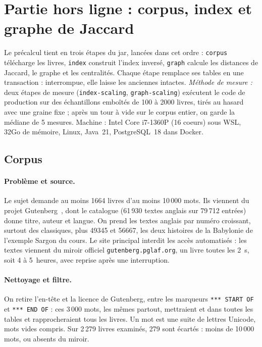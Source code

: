 \section{Partie hors ligne : corpus, index et graphe de Jaccard}
\label{sec:horsligne}

Le précalcul tient en trois étapes du jar, lancées dans cet ordre :
\texttt{corpus} télécharge les livres, \texttt{index} construit l'index inversé,
\texttt{graph} calcule les distances de Jaccard, le graphe et les centralités.
Chaque étape remplace ses tables en une transaction : interrompue, elle laisse
les anciennes intactes. \emph{Méthode de mesure :} deux étapes de mesure
(\texttt{index-scaling}, \texttt{graph-scaling}) exécutent le code de
production sur des échantillons emboîtés de 100 à 2000 livres, tirés au hasard
avec une graine fixe ; après un tour à vide sur le corpus entier, on garde la
médiane de 5 mesures. Machine : Intel Core i7-1360P (16 coeurs) sous WSL, 32Go de
mémoire, Linux, Java~21, PostgreSQL~18 dans Docker.

\subsection{Corpus}
\label{sec:corpus}

\paragraph{Problème et source.} Le sujet demande au moins 1664 livres d'au
moins 10\,000 mots. Ils viennent du projet Gutenberg~\cite{gutenberg}, dont le
catalogue (61\,930 textes anglais sur 79\,712 entrées) donne titre, auteur et
langue. On prend les textes anglais par numéro croissant, surtout des
classiques, plus 49345 et 56667, les deux histoires de la Babylonie de
l'exemple \og Sargon \fg{} du cours. Le site principal interdit
les accès automatisés : les textes viennent du miroir officiel
\texttt{gutenberg.pglaf.org}, un livre toutes les 2~s, soit 4 à 5~heures, avec
reprise après une interruption.

\paragraph{Nettoyage et filtre.} On retire l'en-tête et la licence de
Gutenberg, entre les marqueurs \texttt{*** START OF} et \texttt{*** END OF} :
ces 3\,000 mots, les mêmes partout, mettraient  et
 dans toutes les tables et rapprocheraient tous les livres. Un
mot est une suite de lettres Unicode, mots vides compris. Sur 2\,279 livres
examinés, 279 sont écartés : moins de 10\,000 mots, ou absents du miroir.

